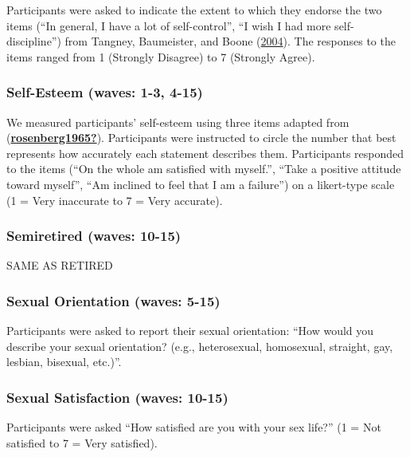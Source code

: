 \documentclass[
  singlecolumn]{report}
\begin{document}
Participants were asked to indicate the extent to which they endorse the
two items (``In general, I have a lot of self-control'', ``I wish I had
more self-discipline'') from Tangney, Baumeister, and Boone
(\protect\hyperlink{ref-tangney_high_2004}{2004}). The responses to the
items ranged from 1 (Strongly Disagree) to 7 (Strongly Agree).

\hypertarget{self-esteem-waves-1-3-4-15}{%
\subsubsection{Self-Esteem (waves: 1-3,
4-15)}\label{self-esteem-waves-1-3-4-15}}

We measured participants' self-esteem using three items adapted from
(\protect\hyperlink{ref-rosenberg1965}{\textbf{rosenberg1965?}}).
Participants were instructed to circle the number that best represents
how accurately each statement describes them. Participants responded to
the items (``On the whole am satisfied with myself.'', ``Take a positive
attitude toward myself'', ``Am inclined to feel that I am a failure'')
on a likert-type scale (1 = Very inaccurate to 7 = Very accurate).

\hypertarget{semiretired-waves-10-15}{%
\subsubsection{Semiretired (waves:
10-15)}\label{semiretired-waves-10-15}}

SAME AS RETIRED

\hypertarget{sexual-orientation-waves-5-15}{%
\subsubsection{Sexual Orientation (waves:
5-15)}\label{sexual-orientation-waves-5-15}}

Participants were asked to report their sexual orientation: ``How would
you describe your sexual orientation? (e.g., heterosexual, homosexual,
straight, gay, lesbian, bisexual, etc.)''.

\hypertarget{sexual-satisfaction-waves-10-15}{%
\subsubsection{Sexual Satisfaction (waves:
10-15)}\label{sexual-satisfaction-waves-10-15}}

Participants were asked ``How satisfied are you with your sex life?'' (1
= Not satisfied to 7 = Very satisfied).
\end{document}
